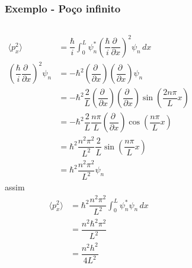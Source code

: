 \documentclass[12pt,brazil,table]{beamer}
\begin{document}

\begin{frame}
  \frametitle{Exemplo - Poço infinito}  
  \fontsize{8.5pt}{11pt}\selectfont
  
  \begin{columns}[c]

  \column{5cm}
    \begin{align*}
            \langle p_x^2 \rangle& = \dfrac{\hbar}{i}\int_0^L \psi_n^* \left( \dfrac{\hbar}{i}\dfrac{\partial\;}{\partial x} \right)^2 \psi_n\,dx\\
            \left( \dfrac{\hbar}{i} \dfrac{\partial\;}{\partial x} \right)^2 \psi_n &= -\hbar^2\left( \dfrac{\partial\;}{\partial x} \right) \left( \dfrac{\partial\;}{\partial x} \right)\psi_n\\
            &= -\hbar^2\dfrac{2}{L}\left( \dfrac{\partial\;}{\partial x} \right) \left( \dfrac{\partial\;}{\partial x} \right)\sin\left( \dfrac{2n\pi}{L}x \right)\\
            &= -\hbar^2\dfrac{2}{L}\dfrac{n\pi}{L}\left( \dfrac{\partial\;}{\partial x} \right)\cos \left( \dfrac{n\pi}{L}x \right)\\
            &= \hbar^2\dfrac{n^2\pi^2}{L^2}\dfrac{2}{L}\sin \left( \dfrac{n\pi}{L}x \right)\\
            &= \hbar^2\dfrac{n^2\pi^2}{L^2}\psi_n
          \end{align*}
  \column{5cm}
          assim
          \begin{align*}
            \langle p_x^2 \rangle& = \hbar^2\dfrac{n^2\pi^2}{L^2}\int_0^L \psi_n^*\psi_n\,dx\\
            & = \dfrac{n^2\hbar^2\pi^2}{L^2}\\
            & = \dfrac{n^2h^2}{4L^2}
          \end{align*}
  \end{columns}
\end{frame}

\end{document}
